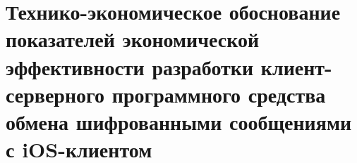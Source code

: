 \section{Технико-экономическое обоснование показателей экономической эффективности разработки клиент-серверного программного средства обмена шифрованными сообщениями с iOS-клиентом}
\label{sec:economics}

